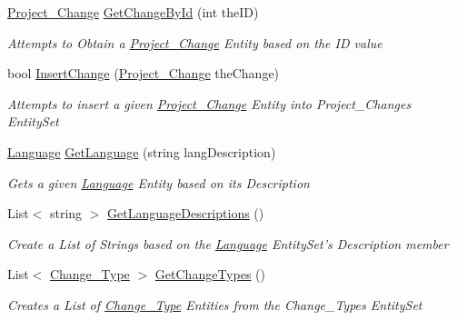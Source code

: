 \begin{DoxyCompactItemize}
\hyperlink{class_k_change_logger_1_1_project___change}{Project\-\_\-\-Change} \hyperlink{class_k_change_logger_1_1_k_change_data_context_data_context_a510ebdbe7168271f548696ab1e77e2b6}{Get\-Change\-By\-Id} (int the\-I\-D)
\begin{DoxyCompactList}\small\item\em Attempts to Obtain a \hyperlink{class_k_change_logger_1_1_project___change}{Project\-\_\-\-Change} Entity based on the I\-D value \end{DoxyCompactList}\item 
bool \hyperlink{class_k_change_logger_1_1_k_change_data_context_data_context_a856c1e726acdec0b4da62af41a0290fe}{Insert\-Change} (\hyperlink{class_k_change_logger_1_1_project___change}{Project\-\_\-\-Change} the\-Change)
\begin{DoxyCompactList}\small\item\em Attempts to insert a given \hyperlink{class_k_change_logger_1_1_project___change}{Project\-\_\-\-Change} Entity into Project\-\_\-\-Changes Entity\-Set \end{DoxyCompactList}\item 
\hyperlink{class_k_change_logger_1_1_language}{Language} \hyperlink{class_k_change_logger_1_1_k_change_data_context_data_context_ae358d2a847743e3d2f496928030cc1f2}{Get\-Language} (string lang\-Description)
\begin{DoxyCompactList}\small\item\em Gets a given \hyperlink{class_k_change_logger_1_1_language}{Language} Entity based on its Description \end{DoxyCompactList}\item 
List$<$ string $>$ \hyperlink{class_k_change_logger_1_1_k_change_data_context_data_context_aa17baf521cc9888221da32666d212e0e}{Get\-Language\-Descriptions} ()
\begin{DoxyCompactList}\small\item\em Create a List of Strings based on the \hyperlink{class_k_change_logger_1_1_language}{Language} Entity\-Set's Description member \end{DoxyCompactList}\item 
List$<$ \hyperlink{class_k_change_logger_1_1_change___type}{Change\-\_\-\-Type} $>$ \hyperlink{class_k_change_logger_1_1_k_change_data_context_data_context_acdf26c3d154414e05cb722e04e0f428e}{Get\-Change\-Types} ()
\begin{DoxyCompactList}\small\item\em Creates a List of \hyperlink{class_k_change_logger_1_1_change___type}{Change\-\_\-\-Type} Entities from the Change\-\_\-\-Types Entity\-Set \end{DoxyCompactList}\item 

\end{DoxyCompactItemize}
